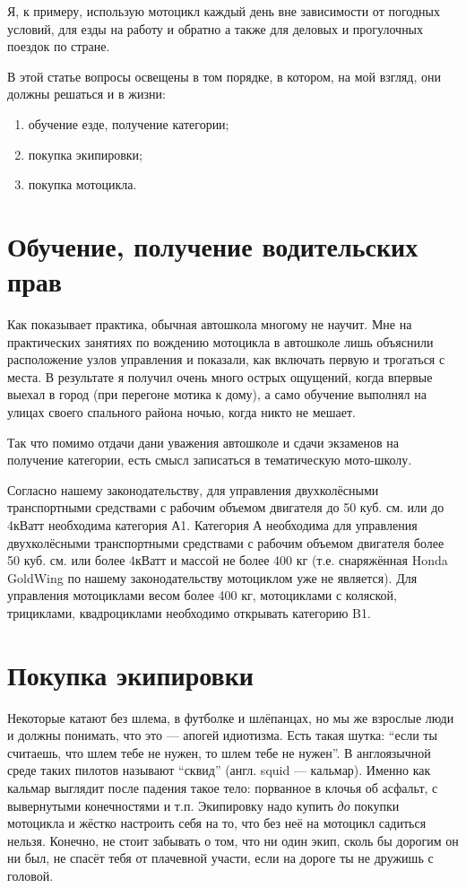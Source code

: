 \documentclass[12pt,a4paper]{article}
\begin{document}
Я, к примеру, использую мотоцикл каждый день вне зависимости от
погодных условий, для езды на работу и обратно а также для деловых и
прогулочных поездок по стране.

В этой статье вопросы освещены в том порядке, в котором, на мой
взгляд, они должны решаться и в жизни:

\begin{enumerate}
\item обучение езде, получение категории;
\item покупка экипировки;
\item покупка мотоцикла.
\end{enumerate}

\section{Обучение, получение водительских прав}

Как показывает практика, обычная автошкола многому не научит.
Мне на практических занятиях по вождению мотоцикла в автошколе лишь
объяснили расположение узлов управления и показали, как включать
первую и трогаться с места. В результате я получил очень много
острых ощущений, когда впервые выехал в город (при перегоне мотика
к дому), а само обучение выполнял на улицах своего спального района
ночью, когда никто не мешает.

Так что помимо отдачи дани уважения автошколе и сдачи экзаменов на
получение категории, есть смысл записаться в тематическую мото-школу.

Согласно нашему законодательству, для управления двухколёсными
транспортными средствами с рабочим объемом двигателя до 50 куб. см.
или до 4кВатт необходима категория А1. Категория А необходима для
управления двухколёсными транспортными средствами с рабочим объемом
двигателя более 50 куб. см. или более 4кВатт и массой не более 400 кг
(т.е. снаряжённая Honda GoldWing по нашему законодательству мотоциклом
уже не является). Для управления мотоциклами весом более 400 кг,
мотоциклами с коляской, трициклами, квадроциклами необходимо открывать
категорию B1.

\section{Покупка экипировки}

Некоторые катают без шлема, в футболке и шлёпанцах, но мы же взрослые
люди и должны понимать, что это --- апогей идиотизма. Есть такая шутка:
``если ты считаешь, что шлем тебе не нужен, то шлем тебе не нужен''.
В англоязычной среде таких пилотов называют ``сквид'' (англ. squid ---
кальмар). Именно как кальмар выглядит после падения такое тело:
порванное в клочья об асфальт, с вывернутыми конечностями и т.п.
Экипировку надо купить \emph{до} покупки мотоцикла и жёстко настроить себя на
то, что без неё на мотоцикл садиться нельзя. Конечно, не стоит забывать
о том, что ни один экип, сколь бы дорогим он ни был, не спасёт тебя от
плачевной участи, если на дороге ты не дружишь с головой.
\end{document}
